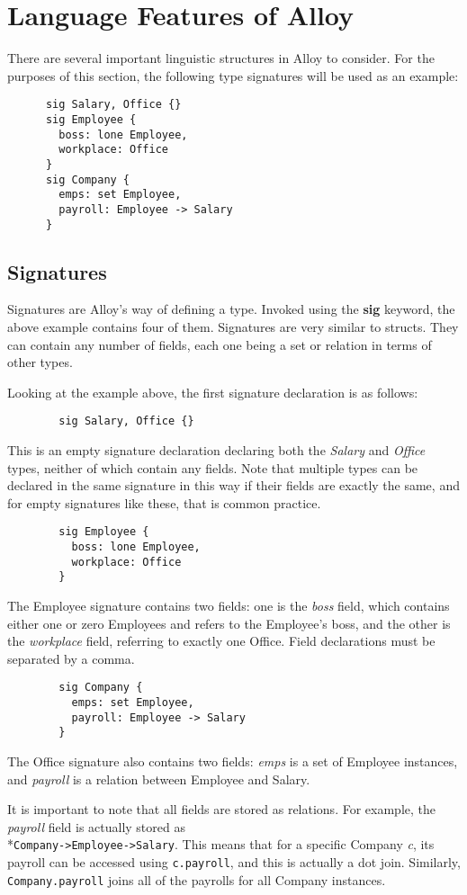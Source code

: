 \documentclass[10pt]{article}
\begin{document}
  \section*{Language Features of Alloy}
    There are several important linguistic structures in Alloy to consider. For the purposes of this section, the following type signatures will be used as an example:
    \begin{lstlisting}
      sig Salary, Office {}
      sig Employee {
        boss: lone Employee,
        workplace: Office
      }
      sig Company {
        emps: set Employee,
        payroll: Employee -> Salary
      }
    \end{lstlisting}
    \subsection*{Signatures}
      Signatures are Alloy's way of defining a type. Invoked using the \textbf{sig} keyword, the above example contains four of them. Signatures are very similar to structs. They can contain any number of fields, each one being a set or relation in terms of other types.\par
      Looking at the example above, the first signature declaration is as follows:
      \begin{lstlisting}
        sig Salary, Office {}
      \end{lstlisting}\par
      This is an empty signature declaration declaring both the \textit{Salary} and \textit{Office} types, neither of which contain any fields. Note that multiple types can be declared in the same signature in this way if their fields are exactly the same, and for empty signatures like these, that is common practice.
      \begin{lstlisting}
        sig Employee {
          boss: lone Employee,
          workplace: Office
        }
      \end{lstlisting}\par
      The Employee signature contains two fields: one is the \textit{boss} field, which contains either one or zero Employees and refers to the Employee's boss, and the other is the \textit{workplace} field, referring to exactly one Office. Field declarations must be separated by a comma.
      \begin{lstlisting}
        sig Company {
          emps: set Employee,
          payroll: Employee -> Salary
        }
      \end{lstlisting}\par
      The Office signature also contains two fields: \textit{emps} is a set of Employee instances, and \textit{payroll} is a relation between Employee and Salary.\par
      It is important to note that all fields are stored as relations. For example, the \textit{payroll} field is actually stored as\\*\lstinline|Company->Employee->Salary|. This means that for a specific Company \textit{c}, its payroll can be accessed using \lstinline|c.payroll|, and this is actually a dot join. Similarly, \lstinline|Company.payroll| joins all of the payrolls for all Company instances.
\end{document}
